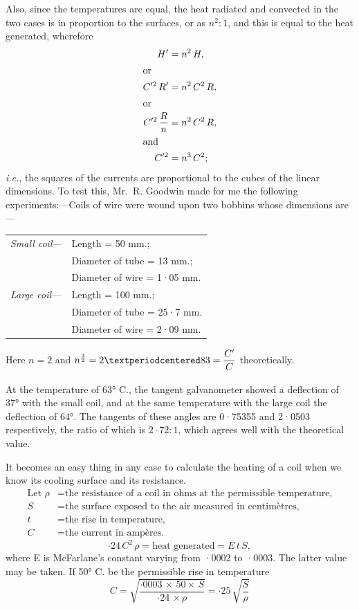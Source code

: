 \documentclass[12pt,oneside]{book}[2021/10/04]
\newcommand{\ie}{\textit{i.e.}}
\newcommand{\xp}{\rule[-2.2ex]{0pt}{3.4ex}}
\begin{document}
Also, since the temperatures are equal, the heat radiated and
convected in the two cases is in proportion to the surfaces, or as
\(n^2 : 1\), and this is equal to the heat generated, wherefore
\begin{align*}
H' &= n^2\,H, \\
\shortintertext{or}
C'^2\,R' &= n^2\,C^2\,R, \\
\shortintertext{or}
C'^2\,\frac{R}{n} &= n^2\,C^2\,R, \\
\shortintertext{and}
C'^2 &= n^3\,C^2;
\end{align*}
\ie, the squares of the currents are proportional to the cubes of
the linear dimensions. To test this, Mr.\ R. Goodwin made for
me the following experiments:—Coils of wire were wound upon
two bobbins whose dimensions are—
\begin{center}
\begin{tabular}{l@{}l}
\textit{Small coil}— & Length = 50 mm.;\\
& Diameter of tube = 13 mm.;\\
& Diameter of wire = 1·05 mm.\\
\textit{Large coil}— & Length = 100 mm.;\\
& Diameter of tube = 25·7 mm.\\
& Diameter of wire = 2·09 mm.\\
\end{tabular}
\end{center}

Here \(n = 2\) and \(n^{\frac{3}{2}} = 2·83 = \xp\dfrac{C'}{C}\) theoretically.

At the temperature of 63° C., the tangent galvanometer showed
a deflection of 37° with the small coil, and at the same temperature
with the large coil the deflection of 64°. The tangents of
these angles are 0·75355 and 2·0503 respectively, the ratio of
which is \(2·72 : 1\), which agrees well with the theoretical value.

It becomes an easy thing in any case to calculate the heating
of a coil when we know its cooling surface and its resistance.
\begin{align*}
\text{Let } \rho &= \text{the resistance of a coil in ohms at the permissible temperature,}\\
S &= \text{the surface exposed to the air measured in centimètres,}\\
t &= \text{the rise in temperature,}\\
C &= \text{the current in ampères.}
\end{align*}
\[
·24\, C^2 \,\rho = \text{heat generated} = E\,t\, S,
\]
where E is McFarlane's constant varying from ·0002 to ·0003.
The latter value may be taken. If 50° C. be the permissible rise
in temperature
\[
C = \sqrt{\frac{·0003 \, \times \, 50 \times \, S}{·24 \, \times \rho}} = ·25 \, \sqrt{\frac{S}{\rho}}
\]
\end{document}
